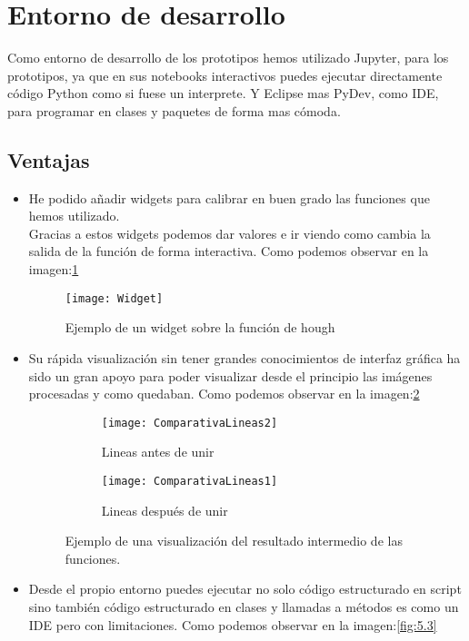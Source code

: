 
\section{Entorno de desarrollo}
Como entorno de desarrollo de los prototipos hemos utilizado Jupyter, para los prototipos, ya que en sus notebooks interactivos puedes ejecutar directamente código Python como si fuese un interprete.
Y Eclipse mas PyDev, como IDE, para programar en clases y paquetes de forma mas cómoda. 

\subsection{Ventajas}
\begin{itemize}
\item He podido añadir widgets para calibrar en buen grado las funciones que hemos utilizado.\\
Gracias a estos widgets podemos dar valores e ir viendo como cambia la salida de la función de forma interactiva. Como podemos observar en la imagen:\ref{fig:5.1}

\begin{figure}[h]
\centering
\texttt{[image: Widget]}
\caption{Ejemplo de un widget sobre la función de hough}
\label{fig:5.1}
\end{figure}

\item Su rápida visualización sin tener grandes conocimientos de interfaz gráfica ha sido un gran apoyo para poder visualizar desde el principio las imágenes procesadas y como quedaban. Como podemos observar en la imagen:\ref{fig:5.2} 

\begin{figure}
\begin{subfigure}[b]{.5\linewidth}
\centering\large \texttt{[image: ComparativaLineas2]}
\caption{Lineas antes de unir}
\end{subfigure}%
\begin{subfigure}[b]{.5\linewidth}
\centering\large \texttt{[image: ComparativaLineas1]}
\caption{Lineas después de unir}
\end{subfigure}
\caption{Ejemplo de una visualización del resultado intermedio de las funciones.}\label{fig:5.2}
\end{figure}


\item Desde el propio entorno puedes ejecutar no solo código estructurado en script sino también código estructurado en clases y llamadas a métodos es como un IDE pero con limitaciones. Como podemos observar en la imagen:\ref{fig:5.3}


\end{itemize}
